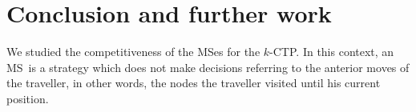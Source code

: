 \documentclass[preprint]{elsarticle}
\newcommand{\kctp}{$k$-CTP}
\newcommand{\mcals}{\mathcal{S}}
\newcommand{\mts}{MS}
\begin{document}
\section{Conclusion and further work} \label{sec:conclusion}

We studied the competitiveness of the \mts es for the \kctp. In this context, an \mts ~is a strategy which does not make decisions referring to the anterior moves of the traveller, in other words, the nodes the traveller visited until his current position.





\end{document}
